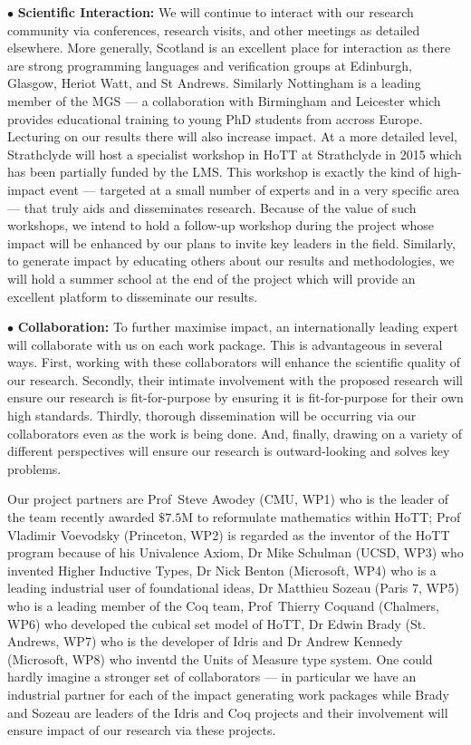 \documentclass[a4paper,11pt]{article}
\begin{document}
\vspace*{0.02in} $\bullet$ {\bf Scientific Interaction:} We will
continue to interact with our research community via conferences,
research visits, and other meetings as detailed elsewhere. More
generally, Scotland is an excellent place for interaction as there are
strong programming languages and verification groups at Edinburgh,
Glasgow, Heriot Watt, and St Andrews. Similarly Nottingham is a
leading member of the MGS --- a collaboration with Birmingham and
Leicester which provides educational training to young PhD students
from accross Europe. Lecturing on our results there will also increase
impact. At a more detailed level, Strathclyde will host a specialist
workshop in HoTT at Strathclyde in 2015 which has been partially
funded by the LMS. This workshop is exactly the kind of high-impact
event --- targeted at a small number of experts and in a very specific
area --- that truly aids and disseminates research. Because of the
value of such workshops, we intend to hold a follow-up workshop during
the project whose impact will be enhanced by our plans to invite key
leaders in the field. Similarly, to generate impact by educating
others about our results and methodologies, we will hold a summer
school at the end of the project which will provide an excellent
platform to disseminate our results.

\vspace*{0.02in}

$\bullet$ {\bf Collaboration:} To further maximise impact, an
internationally leading expert will collaborate with us on each work
package. This is advantageous in several ways. First, working with
these collaborators will enhance the scientific quality of our
research. Secondly, their intimate involvement with the proposed
research will ensure our research is fit-for-purpose by ensuring it is
fit-for-purpose for their own high standards. Thirdly, thorough
dissemination will be occurring via our collaborators even as
the work is being done. And, finally, drawing on a variety of
different perspectives will ensure our research is
outward-looking and solves key problems.

Our project partners are Prof~Steve Awodey (CMU, WP1) who is the
leader of the team recently awarded $\$7.5$M to reformulate mathematics
within HoTT; Prof Vladimir Voevodsky (Princeton, WP2) is regarded as
the inventor of the HoTT program because of his Univalence Axiom, Dr
Mike Schulman (UCSD, WP3) who invented Higher Inductive Types, Dr Nick
Benton (Microsoft, WP4) who is a leading industrial user of
foundational ideas, Dr Matthieu Sozeau (Paris 7, WP5) who is a leading
member of the Coq team, Prof~Thierry Coquand (Chalmers, WP6)
who developed the cubical set model of HoTT, Dr Edwin Brady (St. Andrews,
WP7) who is the developer of Idris and Dr Andrew Kennedy (Microsoft,
WP8) who inventd the Units of Measure type system. One could hardly imagine a
stronger set of collaborators --- in particular we have 
an industrial partner for each of the impact generating
work packages while Brady and Sozeau are leaders of the Idris and Coq
projects and their involvement will ensure impact of our research via
these projects. 
\end{document}
